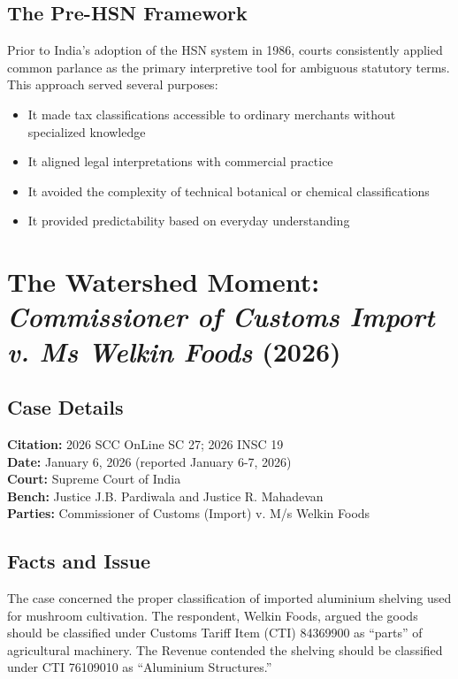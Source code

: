 \documentclass[12pt,a4paper]{article}
\begin{document}
\subsection{The Pre-HSN Framework}

Prior to India's adoption of the HSN system in 1986, courts consistently applied common parlance as the primary interpretive tool for ambiguous statutory terms. This approach served several purposes:

\begin{itemize}
\item It made tax classifications accessible to ordinary merchants without specialized knowledge
\item It aligned legal interpretations with commercial practice
\item It avoided the complexity of technical botanical or chemical classifications
\item It provided predictability based on everyday understanding
\end{itemize}

\section{The Watershed Moment: \textit{Commissioner of Customs Import v. Ms Welkin Foods} (2026)}

\subsection{Case Details}

\textbf{Citation:} 2026 SCC OnLine SC 27; 2026 INSC 19\\
\textbf{Date:} January 6, 2026 (reported January 6-7, 2026)\\
\textbf{Court:} Supreme Court of India\\
\textbf{Bench:} Justice J.B. Pardiwala and Justice R. Mahadevan\\
\textbf{Parties:} Commissioner of Customs (Import) v. M/s Welkin Foods

\subsection{Facts and Issue}

The case concerned the proper classification of imported aluminium shelving used for mushroom cultivation. The respondent, Welkin Foods, argued the goods should be classified under Customs Tariff Item (CTI) 84369900 as ``parts'' of agricultural machinery. The Revenue contended the shelving should be classified under CTI 76109010 as ``Aluminium Structures.''
\end{document}
